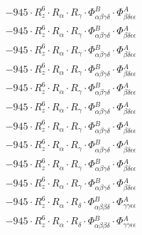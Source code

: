 \documentclass{article}
\begin{document}
\begin{subequations}
\begin{gather}
\begin{array}{c}
 \\[0.2em] 		 - 945 \cdot R_{z}^{6} \cdot R_{\alpha{}} \cdot R_{\gamma{}} \cdot \Phi{}^{B}_{\alpha{}\beta{}\gamma{}\delta{}} \cdot \Phi{}^{A}_{\beta{}\delta{}\epsilon{}\epsilon{}} 
 \\[0.2em] 		 - 945 \cdot R_{z}^{6} \cdot R_{\alpha{}} \cdot R_{\gamma{}} \cdot \Phi{}^{B}_{\alpha{}\beta{}\gamma{}\delta{}} \cdot \Phi{}^{A}_{\beta{}\delta{}\epsilon{}\epsilon{}} 
 \\[0.2em] 		 - 945 \cdot R_{z}^{6} \cdot R_{\alpha{}} \cdot R_{\gamma{}} \cdot \Phi{}^{B}_{\alpha{}\beta{}\gamma{}\delta{}} \cdot \Phi{}^{A}_{\beta{}\delta{}\epsilon{}\epsilon{}} 
 \\[0.2em] 		 - 945 \cdot R_{z}^{6} \cdot R_{\alpha{}} \cdot R_{\gamma{}} \cdot \Phi{}^{B}_{\alpha{}\beta{}\gamma{}\delta{}} \cdot \Phi{}^{A}_{\beta{}\delta{}\epsilon{}\epsilon{}} 
 \\[0.2em] 		 - 945 \cdot R_{z}^{6} \cdot R_{\alpha{}} \cdot R_{\gamma{}} \cdot \Phi{}^{B}_{\alpha{}\beta{}\gamma{}\delta{}} \cdot \Phi{}^{A}_{\beta{}\delta{}\epsilon{}\epsilon{}} 
 \\[0.2em] 		 - 945 \cdot R_{z}^{6} \cdot R_{\alpha{}} \cdot R_{\gamma{}} \cdot \Phi{}^{B}_{\alpha{}\beta{}\gamma{}\delta{}} \cdot \Phi{}^{A}_{\beta{}\delta{}\epsilon{}\epsilon{}} 
 \\[0.2em] 		 - 945 \cdot R_{z}^{6} \cdot R_{\alpha{}} \cdot R_{\gamma{}} \cdot \Phi{}^{B}_{\alpha{}\beta{}\gamma{}\delta{}} \cdot \Phi{}^{A}_{\beta{}\delta{}\epsilon{}\epsilon{}} 
 \\[0.2em] 		 - 945 \cdot R_{z}^{6} \cdot R_{\alpha{}} \cdot R_{\gamma{}} \cdot \Phi{}^{B}_{\alpha{}\beta{}\gamma{}\delta{}} \cdot \Phi{}^{A}_{\beta{}\delta{}\epsilon{}\epsilon{}} 
 \\[0.2em] 		 - 945 \cdot R_{z}^{6} \cdot R_{\alpha{}} \cdot R_{\gamma{}} \cdot \Phi{}^{B}_{\alpha{}\beta{}\gamma{}\delta{}} \cdot \Phi{}^{A}_{\beta{}\delta{}\epsilon{}\epsilon{}} 
 \\[0.2em] 		 - 945 \cdot R_{z}^{6} \cdot R_{\alpha{}} \cdot R_{\gamma{}} \cdot \Phi{}^{B}_{\alpha{}\beta{}\gamma{}\delta{}} \cdot \Phi{}^{A}_{\beta{}\delta{}\epsilon{}\epsilon{}} 
 \\[0.2em] 		 - 945 \cdot R_{z}^{6} \cdot R_{\alpha{}} \cdot R_{\delta{}} \cdot \Phi{}^{B}_{\alpha{}\beta{}\beta{}\delta{}} \cdot \Phi{}^{A}_{\gamma{}\gamma{}\epsilon{}\epsilon{}} 
 \\[0.2em] 		 - 945 \cdot R_{z}^{6} \cdot R_{\alpha{}} \cdot R_{\delta{}} \cdot \Phi{}^{B}_{\alpha{}\beta{}\beta{}\delta{}} \cdot \Phi{}^{A}_{\gamma{}\gamma{}\epsilon{}\epsilon{}} 

\end{array}
\end{gather}
\end{subequations}
\end{document}
